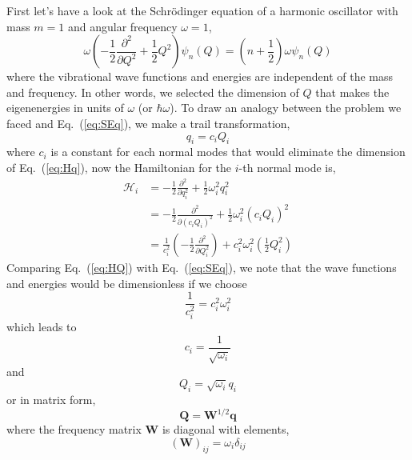 \documentclass[a4paper,notitlepage,preprint]{revtex4-1}
\newcommand\mbf{\mathbf}
\newcommand\mcr{\mathscr}
\begin{document}
First let's have a look at the Schr\"odinger equation of a harmonic oscillator with mass $m = 1$ and angular frequency $\omega = 1$,
\begin{equation}
	\omega\left(-\frac{1}{2}\frac{\partial^2}{\partial Q^2} + \frac{1}{2}Q^2\right) \psi_n(Q) = \left(n+\frac{1}{2}\right)\omega\psi_n(Q)
	\label{eq:SEq}
\end{equation}
\noindent where the vibrational wave functions and energies are independent of the mass and frequency. In other words, we selected the dimension of $Q$ that makes the eigenenergies in units of $\omega$ (or $\hbar\omega$). To draw an analogy between the problem we faced and Eq.~(\ref{eq:SEq}), we make a trail transformation,
\begin{equation}
	q_i = c_i Q_i
	\label{eq:q_to_Q1}
\end{equation}
\noindent where $c_i$ is a constant for each normal modes that would eliminate the dimension of Eq.~(\ref{eq:Hq}), now the Hamiltonian for the $i$-th normal mode is,
\begin{equation}
	\begin{split}
	\mcr{H}_i &= -\frac{1}{2}\frac{\partial^2}{\partial q_i^2} + \frac{1}{2}\omega_i^2 q_i^2 \\
	&= -\frac{1}{2}\frac{\partial^2}{\partial\left(c_i Q_i\right)^2} + \frac{1}{2}\omega_i^2\left(c_i Q_i\right)^2 \\
	&=\frac{1}{c_i^2}\left(-\frac{1}{2}\frac{\partial^2}{\partial Q_i^2}\right) + c_i^2 \omega_i^2 \left(\frac{1}{2}Q_i^2\right)
	\end{split}
	\label{eq:HQ}
\end{equation}
\noindent Comparing Eq.~(\ref{eq:HQ}) with Eq.~(\ref{eq:SEq}), we note that the wave functions and energies would be dimensionless if we choose
\begin{equation}
	\frac{1}{c_i^2} = c_i^2\omega_i^2
	\label{eq:dim_trans}
\end{equation}
\noindent which leads to
\begin{equation}
	c_i = \frac{1}{\sqrt{\omega_i}}
	\label{eq:c}
\end{equation}
\noindent and
\begin{equation}
	Q_i = \sqrt{\omega_i}q_i
	\label{eq:q_to_Q}
\end{equation}
\noindent or in matrix form,
\begin{equation}
	{\mbf Q} = \mbf{W}^{1/2}\mbf{q}
	\label{eq:M_q_to_Q}
\end{equation}
\noindent where the frequency matrix $\mbf{W}$ is diagonal with elements,
\begin{equation}
	(\mbf{W})_{ij} = \omega_i\delta_{ij}
	\label{eq:Wele}
\end{equation}
\end{document}
